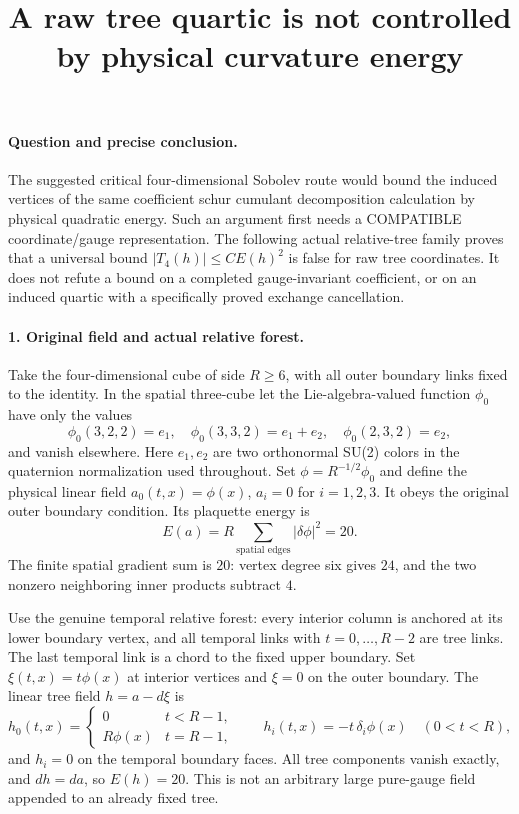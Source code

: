 \documentclass[11pt]{article}
\title{A raw tree quartic is not controlled by physical curvature energy}\author{}\date{}
\begin{document}
\maketitle
\paragraph{Question and precise conclusion.}
The suggested critical four-dimensional Sobolev route would bound
the induced vertices of the same coefficient schur cumulant decomposition calculation by physical quadratic energy. Such an
argument first needs a COMPATIBLE coordinate/gauge representation.
The following actual relative-tree family proves that a universal
bound $|T_4(h)|\le C E(h)^2$ is false for raw tree coordinates.
It does not refute a bound on a completed gauge-invariant coefficient,
or on an induced quartic with a specifically proved exchange cancellation.

\paragraph{1. Original field and actual relative forest.}
Take the four-dimensional cube of side $R\ge6$, with all outer
boundary links fixed to the identity. In the spatial three-cube let
the Lie-algebra-valued function $\phi_0$ have only the values
\[
 \phi_0(3,2,2)=e_1,\quad \phi_0(3,3,2)=e_1+e_2,
 \quad\phi_0(2,3,2)=e_2,
\]
and vanish elsewhere. Here $e_1,e_2$ are two orthonormal SU(2) colors
in the quaternion normalization used throughout.
Set $\phi=R^{-1/2}\phi_0$ and define the physical linear field
$a_0(t,x)=\phi(x)$, $a_i=0$ for $i=1,2,3$.
It obeys the original outer boundary condition. Its plaquette energy is
\[
 E(a)=R\sum_{\text{spatial edges}}|\delta\phi|^2=20. \tag{1}
\]
The finite spatial gradient sum is $20$: vertex degree six gives $24$,
and the two nonzero neighboring inner products subtract $4$.

Use the genuine temporal relative forest: every interior column is
anchored at its lower boundary vertex, and all temporal links with
$t=0,\ldots,R-2$ are tree links. The last temporal link is a chord
to the fixed upper boundary. Set $\xi(t,x)=t\phi(x)$ at interior
vertices and $\xi=0$ on the outer boundary. The linear tree field
$h=a-d\xi$ is
\[
 h_0(t,x)=\begin{cases}0&t<R-1,\\R\phi(x)&t=R-1,\end{cases}
 \qquad h_i(t,x)=-t\,\delta_i\phi(x)\quad(0<t<R),             \tag{2}
\]
and $h_i=0$ on the temporal boundary faces. All tree components
vanish exactly, and $dh=da$, so $E(h)=20$. This is not an arbitrary
large pure-gauge field appended to an already fixed tree.
\end{document}
